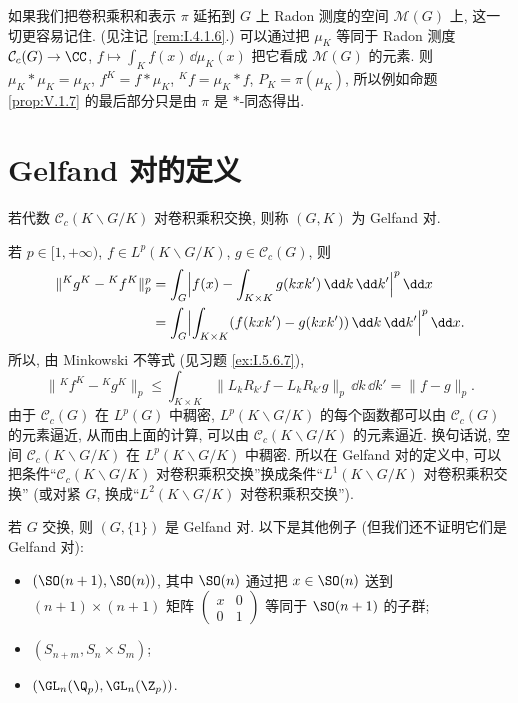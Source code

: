 \begin{remark}[用测度代数理解]
\label{rem:V.1.10}
如果我们把卷积乘积和表示 $\pi$ 延拓到 $G$ 上 Radon 测度的空间 $\mathcal{M}(G)$ 上, 这一切更容易记住. (见注记 \ref{rem:I.4.1.6}.) 可以通过把 $\mu_K$ 等同于 Radon 测度 $\mathcal{C}_c(G) \to \CC$, $f \longmapsto \int_K f(x)\,\dd\mu_K(x)$ 把它看成 $\mathcal{M}(G)$ 的元素. 则 $\mu_K * \mu_K = \mu_K$, $f^K = f * \mu_K$, ${}^Kf = \mu_K * f$, $P_K = \pi(\mu_K)$, 所以例如命题 \ref{prop:V.1.7} 的最后部分只是由 $\pi$ 是 $*$-同态得出.
\end{remark}

\section{Gelfand 对的定义}

\begin{definition}
\label{def:V.2.1}
若代数 $\mathcal{C}_c(K\backslash G/K)$ 对卷积乘积交换, 则称 $(G, K)$ 为 Gelfand 对.
\end{definition}

\begin{remark}[定义的等价形式]
\label{rem:V.2.2}
若 $p \in [1, +\infty)$, $f \in L^p(K\backslash G/K)$, $g \in \mathcal{C}_c(G)$, 则
\begin{align*}
\|{}^Kg^K - {}^Kf^K\|_p^p &= \int_G\Bigl|f(x) - \int_{K \times K}g(kxk')\,\dd k\,\dd k'\Bigr|^p\,\dd x \\
&= \int_G\Bigl|\int_{K \times K}(f(kxk') - g(kxk'))\,\dd k\,\dd k'\Bigr|^p\,\dd x.
\end{align*}
所以, 由 Minkowski 不等式 (见习题 \ref{ex:I.5.6.7}),
\[
\|{}^Kf^K - {}^Kg^K\|_p \leq \int_{K \times K}\|L_kR_{k'}f - L_kR_{k'}g\|_p\,\dd k\,\dd k' = \|f - g\|_p.
\]
由于 $\mathcal{C}_c(G)$ 在 $L^p(G)$ 中稠密, $L^p(K\backslash G/K)$ 的每个函数都可以由 $\mathcal{C}_c(G)$ 的元素逼近, 从而由上面的计算, 可以由 $\mathcal{C}_c(K\backslash G/K)$ 的元素逼近. 换句话说, 空间 $\mathcal{C}_c(K\backslash G/K)$ 在 $L^p(K\backslash G/K)$ 中稠密. 所以在 Gelfand 对的定义中, 可以把条件``$\mathcal{C}_c(K\backslash G/K)$ 对卷积乘积交换''换成条件``$L^1(K\backslash G/K)$ 对卷积乘积交换'' (或对紧 $G$, 换成``$L^2(K\backslash G/K)$ 对卷积乘积交换'').
\end{remark}

\begin{example}
\label{exa:V.2.3}
若 $G$ 交换, 则 $(G, \{1\})$ 是 Gelfand 对.
以下是其他例子 (但我们还不证明它们是 Gelfand 对):
\begin{itemize}
\item $(\SO(n+1), \SO(n))$, 其中 $\SO(n)$ 通过把 $x \in \SO(n)$ 送到 $(n+1) \times (n+1)$ 矩阵 $\begin{pmatrix} x & 0 \\ 0 & 1 \end{pmatrix}$ 等同于 $\SO(n+1)$ 的子群;
\item $(S_{n+m}, S_n \times S_m)$;
\item $(\GL_n(\Q_p), \GL_n(\Z_p))$.
\end{itemize}
\end{example}

